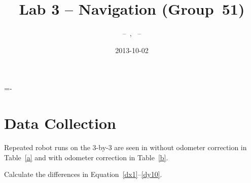 \documentclass[twocolumn]{article}
\author{\bname~--~\bid, \name~--~\id}
\title{Lab 3 -- Navigation (Group~51)}
\date{2013-10-02}
\begin{document}
\abovedisplayskip=-\baselineskip

\maketitle



\section{Data Collection}

Repeated robot runs on the 3-by-3 are seen in without odometer correction in Table~\ref{a} and with odometer correction in Table~\ref{b}.

Calculate the differences in Equation~\ref{dx1}--\ref{dy10}.
\end{document}
